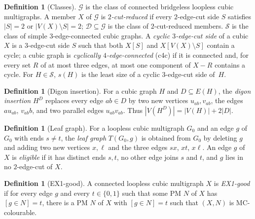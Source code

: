 \documentclass[11pt]{amsart}
\theoremstyle{definition}
\newtheorem{definition}[theorem]{Definition}
\theoremstyle{remark}
\newcommand{\cG}{\mathcal{G}}
\newcommand{\cD}{\mathcal{D}}
\newcommand{\cS}{\mathcal{S}}
\begin{document}
\begin{definition}[Classes]\label{def:classes}
$\cG$ is the class of connected bridgeless loopless cubic multigraphs. A member $X$ of $\cG$ is \emph{$2$-cut-reduced} if every $2$-edge-cut side $S$ satisfies $|S|=2$ or $|V(X)\setminus S|=2$; $\cD\subseteq\cG$ is the class of $2$-cut-reduced members. $\cS$ is the class of simple $3$-edge-connected cubic graphs. A \emph{cyclic $3$-edge-cut side} of a cubic $X$ is a $3$-edge-cut side $S$ such that both $X[S]$ and $X[V(X)\setminus S]$ contain a cycle; a cubic graph is \emph{cyclically $4$-edge-connected} (c4c) if it is connected and, for every set $R$ of at most three edges, at most one component of $X-R$ contains a cycle. For $H\in\cS$, $s(H)$ is the least size of a cyclic $3$-edge-cut side of~$H$.
\end{definition}

\begin{definition}[Digon insertion]\label{def:digon}
For a cubic graph $H$ and $D\subseteq E(H)$, the \emph{digon insertion} $H^D$ replaces every edge $ab\in D$ by two new vertices $u_{ab},v_{ab}$, the edges $au_{ab}$, $v_{ab}b$, and two parallel edges $u_{ab}v_{ab}$. Thus $|V(H^D)|=|V(H)|+2|D|$.
\end{definition}

\begin{definition}[Leaf graph]\label{def:leaf}
For a loopless cubic multigraph $G_0$ and an edge $g$ of $G_0$ with ends $s\neq t$, the \emph{leaf graph} $T(G_0,g)$ is obtained from $G_0$ by deleting $g$ and adding two new vertices $x,\ell$ and the three edges $sx$, $xt$, $x\ell$. An edge $g$ of $X$ is \emph{eligible} if it has distinct ends $s,t$, no other edge joins $s$ and $t$, and $g$ lies in no $2$-edge-cut of $X$.
\end{definition}

\begin{definition}[EX1-good]\label{def:ex1}
A connected loopless cubic multigraph $X$ is \emph{EX1-good} if for every edge $g$ and every $t\in\{0,1\}$ such that some PM $N$ of $X$ has $[g\in N]=t$, there is a PM $N$ of $X$ with $[g\in N]=t$ such that $(X,N)$ is MC-colourable.
\end{definition}
\end{document}
